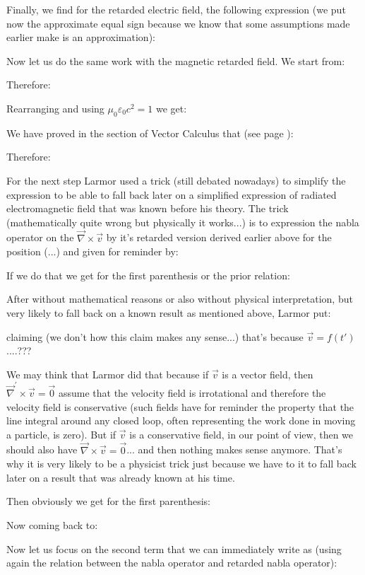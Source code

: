 	Finally, we find for the retarded electric field, the following expression (we put now the approximate equal sign because we know that some assumptions made earlier make is an approximation):
	
	Now let us do the same work with the magnetic retarded field. We start from:
	
	Therefore:
	
	Rearranging and using $\mu_0\varepsilon_0c^2=1$ we get:
	
	We have proved in the section of Vector Calculus that (see page \pageref{curl quotient chain rule}):
	
	Therefore:
	
	For the next step Larmor used a trick (still debated nowadays) to simplify the expression to be able to fall back later on a simplified expression of radiated electromagnetic field that was known before his theory. The trick (mathematically quite wrong but physically it works...) is to expression the nabla operator on the $\vec{\nabla}\times\vec{v}$ by it's retarded version derived earlier above for the position (...) and given for reminder by:
	
	If we do that we get for the first parenthesis or the prior relation:
	
	After without mathematical reasons or also without physical interpretation, but very likely to fall back on a known result as mentioned above, Larmor put:
	
	claiming (we don't how this claim makes any sense...) that's because $\vec{v}=f(t')$....???
	
	We may think that Larmor did that because if $\vec{v}$ is a vector field, then $\vec{\nabla}^\prime\times\vec{v}=\vec{0}$ assume that the velocity field is irrotational and therefore the velocity field is conservative (such fields have for reminder the property that the line integral around any closed loop, often representing the work done in moving a particle, is zero). But if $\vec{v}$ is a conservative field, in our point of view, then we should also have $\vec{\nabla}\times\vec{v}=\vec{0}$... and then nothing makes sense anymore. That's why it is very likely to be a physicist trick just because we have to it to fall back later on a result that was already known at his time.
	
	Then obviously we get for the first parenthesis:
	
	Now coming back to:
	
	Now let us focus on the second term that we can immediately write as (using again the relation between the nabla operator and retarded nabla operator):
	
